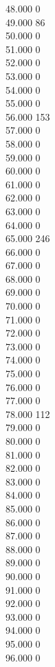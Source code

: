 { 48.000	0 \\
 49.000	86 \\
 50.000	0 \\
 51.000	0 \\
 52.000	0 \\
 53.000	0 \\
 54.000	0 \\
 55.000	0 \\
 56.000	153 \\
 57.000	0 \\
 58.000	0 \\
 59.000	0 \\
 60.000	0 \\
 61.000	0 \\
 62.000	0 \\
 63.000	0 \\
 64.000	0 \\
 65.000	246 \\
 66.000	0 \\
 67.000	0 \\
 68.000	0 \\
 69.000	0 \\
 70.000	0 \\
 71.000	0 \\
 72.000	0 \\
 73.000	0 \\
 74.000	0 \\
 75.000	0 \\
 76.000	0 \\
 77.000	0 \\
 78.000	112 \\
 79.000	0 \\
 80.000	0 \\
 81.000	0 \\
 82.000	0 \\
 83.000	0 \\
 84.000	0 \\
 85.000	0 \\
 86.000	0 \\
 87.000	0 \\
 88.000	0 \\
 89.000	0 \\
 90.000	0 \\
 91.000	0 \\
 92.000	0 \\
 93.000	0 \\
 94.000	0 \\
 95.000	0 \\
 96.000	0 \\
}
